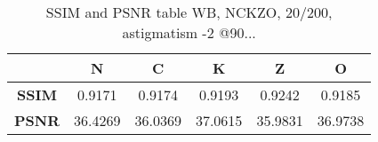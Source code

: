 
\begin{table}[h]
	\centering
	\label{table:metrics_astig-2@90_wb}
	\caption[???]{SSIM and PSNR table WB, NCKZO, 20/200, astigmatism -2 @90...}

	\begin{tabular}{cccccc}
	{\bf }                          & {\bf N} & {\bf C} & {\bf K} & {\bf Z} & {\bf O} \\ \hline
	\multicolumn{1}{c|}{{\bf SSIM}} & 0.9171  & 0.9174  & 0.9193  & 0.9242  & 0.9185  		\\
	\multicolumn{1}{c|}{{\bf PSNR}} & 36.4269 & 36.0369 & 37.0615 & 35.9831 & 36.9738
	\end{tabular}
\end{table}